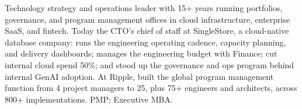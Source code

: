 \documentclass[11pt,letterpaper,sans]{moderncv}
\begin{document}
\makecvtitle


\vspace{6pt}
\small{Technology strategy and operations leader with 15+ years running portfolios, governance, and program management offices in cloud infrastructure, enterprise SaaS, and fintech. Today the CTO's chief of staff at SingleStore, a cloud-native database company: runs the engineering operating cadence, capacity planning, and delivery dashboards; manages the engineering budget with Finance; cut internal cloud spend 50\%; and stood up the governance and ops program behind internal GenAI adoption. At Ripple, built the global program management function from 4 project managers to 25, plus 75+ engineers and architects, across 800+ implementations. PMP; Executive MBA.}

\end{document}

